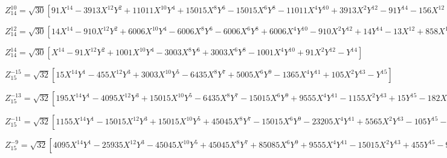 \documentclass[10pt,landscape]{article}
\begin{document}
\vspace{1.2 mm}
\noindent $ Z^{10}_{14} = \sqrt{30} [91X^{14} -3913X^{12}Y^{2} +11011X^{10}Y^{4} +15015X^{8}Y^{6} -15015X^{6}Y^{8} -11011X^{4}Y^{10} +3913X^{2}Y^{12} -91Y^{14} -156X^{12} +6864X^{10}Y^{2} -25740X^{8}Y^{4} +25740X^{4}Y^{8} -6864X^{2}Y^{10} +156Y^{12} +66X^{10} -2970X^{8}Y^{2} +13860X^{6}Y^{4} -13860X^{4}Y^{6} +2970X^{2}Y^{8} -66Y^{10}] $

\vspace{1.2 mm}
\noindent $ Z^{12}_{14} = \sqrt{30} [14X^{14} -910X^{12}Y^{2} +6006X^{10}Y^{4} -6006X^{8}Y^{6} -6006X^{6}Y^{8} +6006X^{4}Y^{10} -910X^{2}Y^{12} +14Y^{14} -13X^{12} +858X^{10}Y^{2} -6435X^{8}Y^{4} +12012X^{6}Y^{6} -6435X^{4}Y^{8} +858X^{2}Y^{10} -13Y^{12}] $

\vspace{1.2 mm}
\noindent $ Z^{14}_{14} = \sqrt{30} [X^{14} -91X^{12}Y^{2} +1001X^{10}Y^{4} -3003X^{8}Y^{6} +3003X^{6}Y^{8} -1001X^{4}Y^{10} +91X^{2}Y^{12} -Y^{14}] $

\vspace{1.2 mm}
\noindent $ Z^{-15}_{15} = \sqrt{32} [15X^{14}Y^{1} -455X^{12}Y^{3} +3003X^{10}Y^{5} -6435X^{8}Y^{7} +5005X^{6}Y^{9} -1365X^{4}Y^{11} +105X^{2}Y^{13} -Y^{15}] $

\vspace{1.2 mm}
\noindent $ Z^{-13}_{15} = \sqrt{32} [195X^{14}Y^{1} -4095X^{12}Y^{3} +15015X^{10}Y^{5} -6435X^{8}Y^{7} -15015X^{6}Y^{9} +9555X^{4}Y^{11} -1155X^{2}Y^{13} +15Y^{15} -182X^{12}Y^{1} +4004X^{10}Y^{3} -18018X^{8}Y^{5} +24024X^{6}Y^{7} -10010X^{4}Y^{9} +1092X^{2}Y^{11} -14Y^{13}] $

\vspace{1.2 mm}
\noindent $ Z^{-11}_{15} = \sqrt{32} [1155X^{14}Y^{1} -15015X^{12}Y^{3} +15015X^{10}Y^{5} +45045X^{8}Y^{7} -15015X^{6}Y^{9} -23205X^{4}Y^{11} +5565X^{2}Y^{13} -105Y^{15} -2002X^{12}Y^{1} +28028X^{10}Y^{3} -54054X^{8}Y^{5} -24024X^{6}Y^{7} +50050X^{4}Y^{9} -9828X^{2}Y^{11} +182Y^{13} +858X^{10}Y^{1} -12870X^{8}Y^{3} +36036X^{6}Y^{5} -25740X^{4}Y^{7} +4290X^{2}Y^{9} -78Y^{11}] $

\vspace{1.2 mm}
\noindent $ Z^{-9}_{15} = \sqrt{32} [4095X^{14}Y^{1} -25935X^{12}Y^{3} -45045X^{10}Y^{5} +45045X^{8}Y^{7} +85085X^{6}Y^{9} +9555X^{4}Y^{11} -15015X^{2}Y^{13} +455Y^{15} -9828X^{12}Y^{1} +72072X^{10}Y^{3} +36036X^{8}Y^{5} -144144X^{6}Y^{7} -60060X^{4}Y^{9} +37128X^{2}Y^{11} -1092Y^{13} +7722X^{10}Y^{1} -64350X^{8}Y^{3} +36036X^{6}Y^{5} +77220X^{4}Y^{7} -30030X^{2}Y^{9} +858Y^{11} -1980X^{8}Y^{1} +18480X^{6}Y^{3} -27720X^{4}Y^{5} +7920X^{2}Y^{7} -220Y^{9}] $
\end{document}
